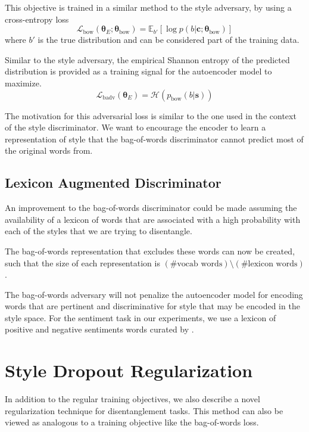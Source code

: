 This objective is trained in a similar method to the style adversary, by using a cross-entropy loss
\begin{equation} \label{eqn:adv-bow-disc-loss}
	\mathcal{L}_\text{bow}(\bm\theta_{E};\bm\theta_\text{bow}) =
	\mathbb{E}_{b'} [\log p(b | \bm c; \bm\theta_\text{bow})]
\end{equation}
where $b'$ is the true distribution and can be considered part of the training data.

Similar to the style adversary, the empirical Shannon entropy of the predicted distribution is provided as a training signal for the autoencoder model to maximize.
\begin{equation}
	\mathcal{L}_\text{badv}(\bm\theta_E) = \mathcal{H}(p_\text{bow}(b | \bm s))
\end{equation}

The motivation for this adversarial loss is similar to the one used in the context of the style discriminator. We want to encourage the encoder to learn a representation of style that the bag-of-words discriminator cannot predict most of the original words from.

\subsection{Lexicon Augmented Discriminator}

An improvement to the bag-of-words discriminator could be made assuming the availability of a lexicon of words that are associated with a high probability with each of the styles that we are trying to disentangle.

The bag-of-words representation that excludes these words can now be created, such that the size of each representation is $(\text{\# vocab words}) \setminus (\text{\# lexicon words})$.

The bag-of-words adversary will not penalize the autoencoder model for encoding words that are pertinent and discriminative for style that may be encoded in the style space. For the sentiment task in our experiments, we use a lexicon of positive and negative sentiments words curated by \cite{hu2004mining}.


\section{Style Dropout Regularization} \label{ssec:style-dropout}

In addition to the regular training objectives, we also describe a novel regularization technique for disentanglement tasks. This method can also be viewed as analogous to a training objective like the bag-of-words loss.


